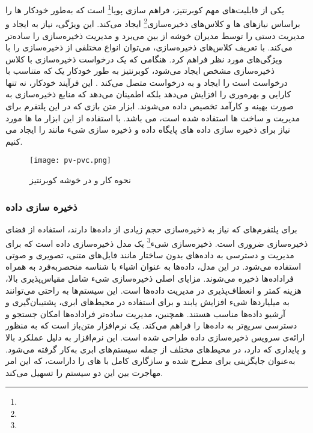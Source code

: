یکی از قابلیت‌های مهم کوبرنتیز، فراهم سازی پویا\footnote{} است که به‌طور خودکار ها را براساس نیازهای ها و کلاس‌های ذخیره‌سازی\footnote{} ایجاد می‌کند. این ویژگی، نیاز به ایجاد و مدیریت دستی  را توسط مدیران خوشه از بین می‌برد و مدیریت ذخیره‌سازی را ساده‌تر می‌کند. با تعریف کلاس‌های ذخیره‌سازی، می‌توان انواع مختلفی از ذخیره‌سازی را با ویژگی‌های مورد نظر فراهم کرد. هنگامی که یک درخواست ذخیره‌سازی  با کلاس ذخیره‌سازی مشخص ایجاد می‌شود، کوبرنتیز به طور خودکار یک  که متناسب با درخواست است را ایجاد و به درخواست متصل می‌کند \cite{Kubernetes1}. این فرآیند خودکار، نه تنها کارایی و بهره‌وری را افزایش می‌دهد بلکه اطمینان می‌دهد که منابع ذخیره‌سازی به صورت بهینه و کارآمد تخصیص داده می‌شوند. ابزار متن بازی که در این پلتفرم برای مدیریت و ساخت ها استفاده شده است،  می باشد. با استفاده از این ابزار ما ها مورد نیاز برای ذخیره سازی داده های پایگاه داده و ذخیره سازی شیء مانند  را ایجاد می کنیم. 

\begin{figure}[t]
	\centering
	\texttt{[image: pv-pvc.png]}
	\caption{نحوه کار  و  در خوشه کوبرنتیز}
	\label{fig: pv pvc}
\end{figure}

\subsubsection{ذخیره سازی داده}
برای پلتفرم‌های  که نیاز به ذخیره‌سازی حجم زیادی از داده‌ها دارند، استفاده از فضای ذخیره‌سازی ضروری است. ذخیره‌سازی شیء\footnote{} یک مدل ذخیره‌سازی داده‌ است که برای مدیریت و دسترسی به داده‌های بدون ساختار مانند فایل‌های متنی، تصویری و صوتی استفاده می‌شود. در این مدل، داده‌ها به عنوان اشیاء با شناسه منحصربه‌فرد به همراه فراداده‌ها ذخیره می‌شوند. مزایای اصلی ذخیره‌سازی شیء شامل مقیاس‌پذیری بالا، هزینه کمتر و انعطاف‌پذیری در مدیریت داده‌ها است. این سیستم‌ها به راحتی می‌توانند به میلیاردها شیء افزایش یابند و برای استفاده در محیط‌های ابری، پشتیبان‌گیری و آرشیو داده‌ها مناسب هستند. همچنین، مدیریت ساده‌تر فراداده‌ها امکان جستجو و دسترسی سریع‌تر به داده‌ها را فراهم می‌کند.  \cite{MinIO} یک نرم‌افزار متن‌باز است که به منظور ارائه‌ی سرویس ذخیره‌سازی داده طراحی شده است. این نرم‌افزار به دلیل عملکرد بالا و پایداری که دارد، در محیط‌های مختلف از جمله سیستم‌های ابری به‌کار گرفته می‌شود.  به‌عنوان جایگزینی برای  مطرح شده و سازگاری کامل با های  را داراست، که این امر مهاجرت بین این دو سیستم را تسهیل می‌کند.


